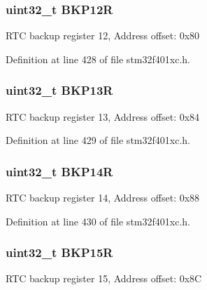 \subsubsection[{\texorpdfstring{B\+K\+P12R}{BKP12R}}]{ uint32\+\_\+t B\+K\+P12R}\hypertarget{struct_r_t_c___type_def_a6f7eee5ae8a32c07f9c8fe14281bdaf3}{}\label{struct_r_t_c___type_def_a6f7eee5ae8a32c07f9c8fe14281bdaf3}
R\+TC backup register 12, Address offset\+: 0x80 

Definition at line 428 of file stm32f401xc.\+h.

\subsubsection[{\texorpdfstring{B\+K\+P13R}{BKP13R}}]{ uint32\+\_\+t B\+K\+P13R}\hypertarget{struct_r_t_c___type_def_a6ed4c3a0d4588a75078e9f8e376b4d06}{}\label{struct_r_t_c___type_def_a6ed4c3a0d4588a75078e9f8e376b4d06}
R\+TC backup register 13, Address offset\+: 0x84 

Definition at line 429 of file stm32f401xc.\+h.

\subsubsection[{\texorpdfstring{B\+K\+P14R}{BKP14R}}]{ uint32\+\_\+t B\+K\+P14R}\hypertarget{struct_r_t_c___type_def_ac60f13e6619724747e61cfbff55b9fab}{}\label{struct_r_t_c___type_def_ac60f13e6619724747e61cfbff55b9fab}
R\+TC backup register 14, Address offset\+: 0x88 

Definition at line 430 of file stm32f401xc.\+h.

\subsubsection[{\texorpdfstring{B\+K\+P15R}{BKP15R}}]{ uint32\+\_\+t B\+K\+P15R}\hypertarget{struct_r_t_c___type_def_afafaddc3a983eb71332b7526d82191ad}{}\label{struct_r_t_c___type_def_afafaddc3a983eb71332b7526d82191ad}
R\+TC backup register 15, Address offset\+: 0x8C 

